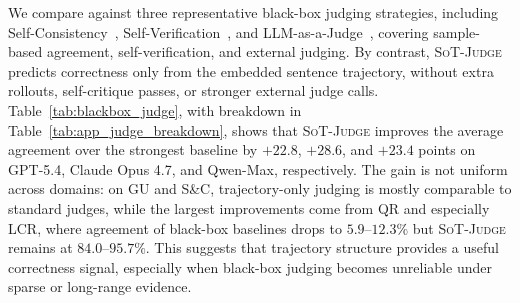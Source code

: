    \par\vspace{-1mm}%
    \noindent
    
    We compare against three representative black-box judging strategies, including Self-Consistency~\citep{wang2023selfconsistency}, Self-Verification~\citep{weng2023large}, and LLM-as-a-Judge~\citep{zheng2023judging}, covering sample-based agreement, self-verification, and external judging. By contrast, \textsc{SoT-Judge} predicts correctness only from the embedded sentence trajectory, without extra rollouts, self-critique passes, or stronger external judge calls. Table~\ref{tab:blackbox_judge}, with breakdown in Table~\ref{tab:app_judge_breakdown}, shows that \textsc{SoT-Judge} improves the average agreement over the strongest baseline by \(+22.8\), \(+28.6\), and \(+23.4\) points on GPT-5.4, Claude Opus 4.7, and Qwen-Max, respectively. The gain is not uniform across domains: on GU and S\&C, trajectory-only judging is mostly comparable to standard judges, while the largest improvements come from QR and especially LCR, where agreement of black-box baselines drops to \(5.9\)--\(12.3\%\) but \textsc{SoT-Judge} remains at \(84.0\)--\(95.7\%\). This suggests that trajectory structure provides a useful correctness signal, especially when black-box judging becomes unreliable under sparse or long-range evidence.
